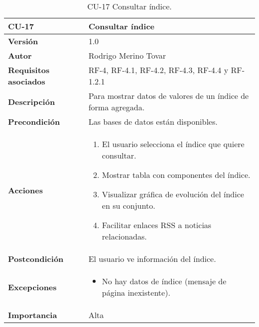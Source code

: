 \begin{table}[p]
	\centering
	\begin{tabularx}{\linewidth}{ p{} p{} }
		\toprule
		\textbf{CU-17}    & \textbf{Consultar índice}\\
		\toprule
		\textbf{Versión}              & 1.0    \\
		\textbf{Autor}                & Rodrigo Merino Tovar \\
		\textbf{Requisitos asociados} & RF-4, RF-4.1, RF-4.2, RF-4.3, RF-4.4 y RF-1.2.1  \\
		\textbf{Descripción}          & Para mostrar datos de valores de un índice de forma agregada.\\
		\textbf{Precondición}         & Las bases de datos están disponibles.  \\
		\textbf{Acciones}             &
		\begin{enumerate}
			\def\labelenumi{\arabic{enumi}.}
			\tightlist
			\item El usuario selecciona el índice que quiere consultar. 
			\item Mostrar tabla con componentes del índice.
			\item Visualizar gráfica de evolución del índice en su conjunto.  
			\item Facilitar enlaces RSS a noticias relacionadas.
		\end{enumerate}\\
		\textbf{Postcondición}        & El usuario ve información del índice. \\
		\textbf{Excepciones}          & 
		\begin{itemize}
			\tightlist
			\item No hay datos de índice (mensaje de página inexistente).
		\end{itemize} \\
		\textbf{Importancia}          & Alta \\
		\bottomrule
	\end{tabularx}
	\caption{CU-17 Consultar índice.}
\end{table}


